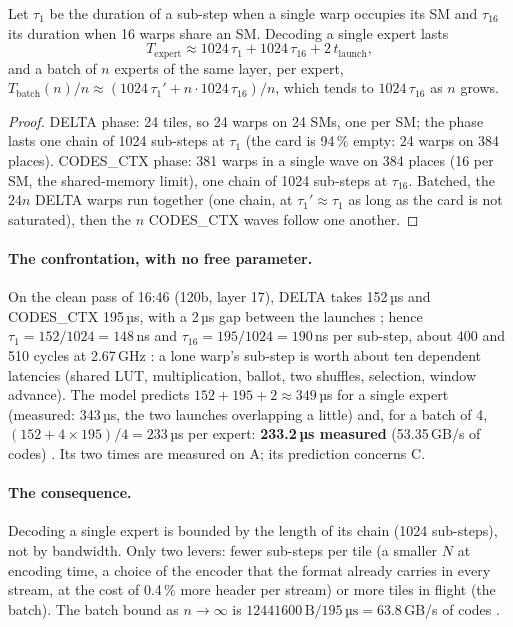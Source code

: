 \begin{proposition}\label{prop:t2n-latence}
Let $\tau_1$ be the duration of a sub-step when a single warp occupies its SM and $\tau_{16}$ its duration when 16 warps share an SM. Decoding a single expert lasts
\[
T_{\mathrm{expert}} \approx \num{1024}\,\tau_1 + \num{1024}\,\tau_{16} + 2\,t_{\mathrm{launch}},
\]
and a batch of $n$ experts of the same layer, per expert, $T_{\mathrm{batch}}(n)/n \approx (\num{1024}\,\tau_1' + n \cdot \num{1024}\,\tau_{16})/n$, which tends to $\num{1024}\,\tau_{16}$ as $n$ grows.
\end{proposition}

\begin{proof}
DELTA phase: 24 tiles, so 24 warps on 24 SMs, one per SM; the phase lasts one chain of \num{1024} sub-steps at $\tau_1$ (the card is 94\,\% empty: 24 warps on 384 places). CODES\_CTX phase: 381 warps in a single wave on 384 places (16 per SM, the shared-memory limit), one chain of \num{1024} sub-steps at $\tau_{16}$. Batched, the $24n$ DELTA warps run together (one chain, at $\tau_1' \approx \tau_1$ as long as the card is not saturated), then the $n$ CODES\_CTX waves follow one another.
\end{proof}

\paragraph{The confrontation, with no free parameter.} On the clean pass of 16:46 (120b, layer 17), DELTA takes 152\,µs and CODES\_CTX 195\,µs, with a 2\,µs gap between the launches \mes; hence $\tau_1 = 152/\num{1024} = 148$\,ns and $\tau_{16} = 195/\num{1024} = 190$\,ns per sub-step, about 400 and 510 cycles at 2.67\,GHz \calc: a lone warp's sub-step is worth about ten dependent latencies (shared LUT, multiplication, ballot, two shuffles, selection, window advance). The model predicts $152 + 195 + 2 \approx 349$\,µs for a single expert (measured: 343\,µs, the two launches overlapping a little) and, for a batch of 4, $(152 + 4 \times 195)/4 = 233$\,µs per expert: \textbf{233.2\,µs measured} (53.35\,GB/s of codes) \calc. Its two times are measured on A; its prediction concerns C.

\paragraph{The consequence.} Decoding a single expert is bounded by the length of its chain (\num{1024} sub-steps), not by bandwidth. Only two levers: fewer sub-steps per tile (a smaller $N$ at encoding time, a choice of the encoder that the format already carries in every stream, at the cost of 0.4\,\% more header per stream) or more tiles in flight (the batch). The batch bound as $n \to \infty$ is $\num{12441600}\,\text{B} / 195\,\text{µs} = 63.8$\,GB/s of codes \calc.

